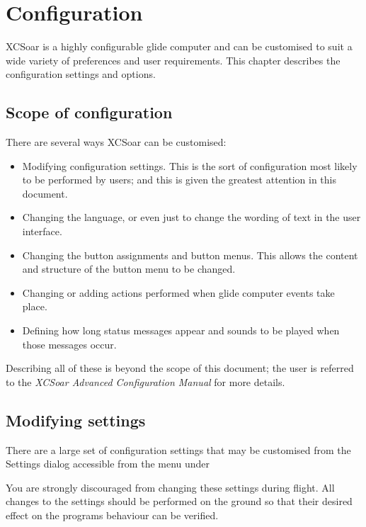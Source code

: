 \documentclass[a4paper,12pt]{refrep}
\begin{document}

\chapter{Configuration}\label{cha:configuration}
XCSoar is a highly configurable glide computer and can be customised
to suit a wide variety of preferences and user requirements.  This
chapter describes the configuration settings and options.

\section{Scope of configuration}

There are several ways XCSoar can be customised:
\begin{itemize}

\item Modifying configuration settings.  This is the sort of configuration
 most likely to be performed by users; and this is given the greatest attention in this document.
\item Changing the language, or even just to change the wording
  of text in the user interface.
\item Changing the button assignments and button menus.  This allows 
the content and structure of the button menu to be changed. 
\item Changing or adding actions performed when glide computer events
 take place.
\item Defining how long status messages appear and sounds to be played
 when those messages occur.
\end{itemize}
Describing all of these is beyond the scope of this document;
the user is referred to the {\em XCSoar Advanced Configuration Manual} 
for more details.  

\section{Modifying settings}

There are a large set of configuration settings that may be customised
from the Settings dialog accessible from the menu under
\begin{quote}
\blink{}\blink{}
\end{quote}

You are strongly discouraged from changing these settings during
flight.  \warning  All changes to the settings should be performed on the ground
so that their desired effect on the programs behaviour can be
verified.
\end{document}
